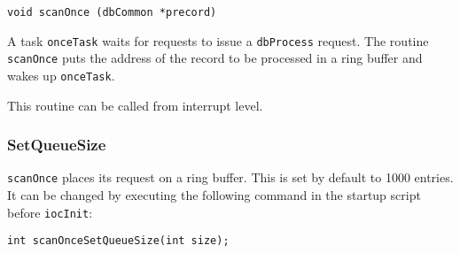 \begin{verbatim}
void scanOnce (dbCommon *precord)
\end{verbatim}

A task \verb|onceTask| waits for requests to issue a \verb|dbProcess| request.
The routine \verb|scanOnce| puts the address of the record to be processed in a ring buffer and wakes up \verb|onceTask|.

This routine can be called from interrupt level.

\subsubsection{SetQueueSize}

\verb|scanOnce| places its request on a ring buffer.
This is set by default to 1000 entries.
It can be changed by executing the following command in the startup script before \verb|iocInit|:

\begin{verbatim}
int scanOnceSetQueueSize(int size);
\end{verbatim}



